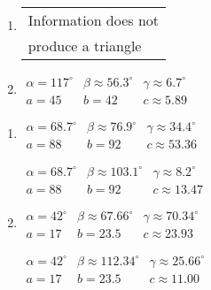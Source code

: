 \begin{multicols}{2} 

\begin{enumerate}

\setcounter{enumi}{\value{HW}}

\item \begin{tabular}{l}
Information does not \\
produce a triangle \end{tabular}

\item $\begin{array}{lll}
\alpha = 117^{\circ} & \beta \approx 56.3^{\circ} & \gamma \approx 6.7^{\circ} \\
a = 45 & b = 42 & c \approx 5.89 \end{array}$

\setcounter{HW}{\value{enumi}}

\end{enumerate}

\end{multicols}

\begin{multicols}{2} 

\begin{enumerate}

\setcounter{enumi}{\value{HW}}

\item $\begin{array}{lll}
\alpha = 68.7^{\circ} & \beta \approx 76.9^{\circ} & \gamma \approx 34.4^{\circ} \\
a = 88 & b = 92 & c \approx 53.36 \end{array}$

$\begin{array}{lll}
\alpha = 68.7^{\circ} & \beta \approx 103.1^{\circ} & \gamma \approx 8.2^{\circ} \\
a = 88 & b = 92 & c \approx 13.47\end{array}$

\item $\begin{array}{lll}
\alpha = 42^{\circ} & \beta \approx 67.66^{\circ} & \gamma \approx 70.34^{\circ} \\
a = 17 & b = 23.5 & c \approx 23.93 \end{array}$

$\begin{array}{lll}
\alpha = 42^{\circ} & \beta \approx 112.34^{\circ} & \gamma \approx 25.66^{\circ} \\
a = 17 & b = 23.5 & c \approx 11.00 \end{array}$

\setcounter{HW}{\value{enumi}}

\end{enumerate}

\end{multicols}

